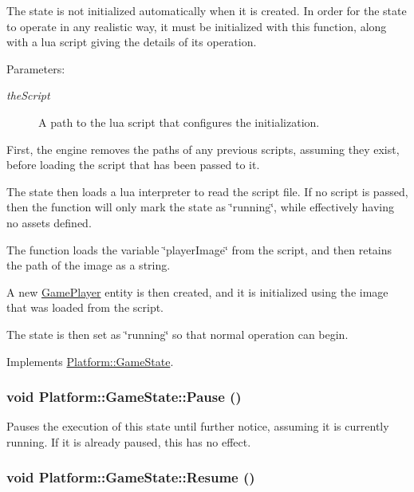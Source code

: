 The state is not initialized automatically when it is created. In order for the state to operate in any realistic way, it must be initialized with this function, along with a lua script giving the details of its operation.

\begin{Desc}
\item[Parameters:]
\begin{description}
\item[{\em theScript}]A path to the lua script that configures the initialization. \end{description}
\end{Desc}


First, the engine removes the paths of any previous scripts, assuming they exist, before loading the script that has been passed to it.

The state then loads a lua interpreter to read the script file. If no script is passed, then the function will only mark the state as \char`\"{}running\char`\"{}, while effectively having no assets defined.

The function loads the variable \char`\"{}playerImage\char`\"{} from the script, and then retains the path of the image as a string.

A new \hyperlink{class_platform_1_1_game_player}{GamePlayer} entity is then created, and it is initialized using the image that was loaded from the script.

The state is then set as \char`\"{}running\char`\"{} so that normal operation can begin.

Implements \hyperlink{class_platform_1_1_game_state_37209d2617d04c6387a961cb2c8f3663}{Platform::GameState}.\hypertarget{class_platform_1_1_game_state_aa49568d0da70ded81719cfa83052028}{
\subsubsection[{Pause}]{\setlength{\rightskip}{0pt plus 5cm}void Platform::GameState::Pause ()}}
\label{d4/d4f/class_platform_1_1_game_state_aa49568d0da70ded81719cfa83052028}


Pauses the execution of this state until further notice, assuming it is currently running. If it is already paused, this has no effect. \hypertarget{class_platform_1_1_game_state_d2a5e5f3ba807bbf9445baba9f36fea7}{
\subsubsection[{Resume}]{\setlength{\rightskip}{0pt plus 5cm}void Platform::GameState::Resume ()}}
\label{d4/d4f/class_platform_1_1_game_state_d2a5e5f3ba807bbf9445baba9f36fea7}


